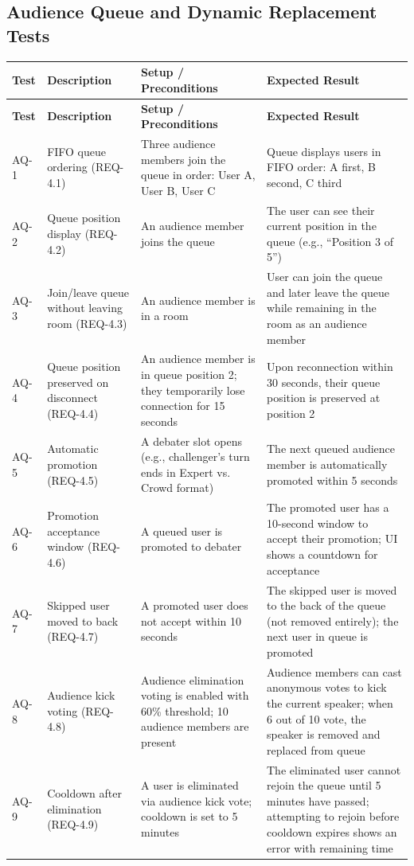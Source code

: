 \documentclass[12pt]{article}
\begin{document}
\subsection{Audience Queue and Dynamic Replacement Tests}

\begin{longtable}{|p{1.5cm}|p{3cm}|p{4cm}|p{4cm}|}
\hline
\textbf{Test} & \textbf{Description} & \textbf{Setup / Preconditions} & \textbf{Expected Result} \\
\hline
\endfirsthead
\hline
\textbf{Test} & \textbf{Description} & \textbf{Setup / Preconditions} & \textbf{Expected Result} \\
\hline
\endhead
AQ-1 & FIFO queue ordering (REQ-4.1) & Three audience members join the queue in order: User A, User B, User C & Queue displays users in FIFO order: A first, B second, C third \\
\hline
AQ-2 & Queue position display (REQ-4.2) & An audience member joins the queue & The user can see their current position in the queue (e.g., ``Position 3 of 5'') \\
\hline
AQ-3 & Join/leave queue without leaving room (REQ-4.3) & An audience member is in a room & User can join the queue and later leave the queue while remaining in the room as an audience member \\
\hline
AQ-4 & Queue position preserved on disconnect (REQ-4.4) & An audience member is in queue position 2; they temporarily lose connection for 15 seconds & Upon reconnection within 30 seconds, their queue position is preserved at position 2 \\
\hline
AQ-5 & Automatic promotion (REQ-4.5) & A debater slot opens (e.g., challenger's turn ends in Expert vs. Crowd format) & The next queued audience member is automatically promoted within 5 seconds \\
\hline
AQ-6 & Promotion acceptance window (REQ-4.6) & A queued user is promoted to debater & The promoted user has a 10-second window to accept their promotion; UI shows a countdown for acceptance \\
\hline
AQ-7 & Skipped user moved to back (REQ-4.7) & A promoted user does not accept within 10 seconds & The skipped user is moved to the back of the queue (not removed entirely); the next user in queue is promoted \\
\hline
AQ-8 & Audience kick voting (REQ-4.8) & Audience elimination voting is enabled with 60\% threshold; 10 audience members are present & Audience members can cast anonymous votes to kick the current speaker; when 6 out of 10 vote, the speaker is removed and replaced from queue \\
\hline
AQ-9 & Cooldown after elimination (REQ-4.9) & A user is eliminated via audience kick vote; cooldown is set to 5 minutes & The eliminated user cannot rejoin the queue until 5 minutes have passed; attempting to rejoin before cooldown expires shows an error with remaining time \\
\hline
\end{longtable}
\end{document}
